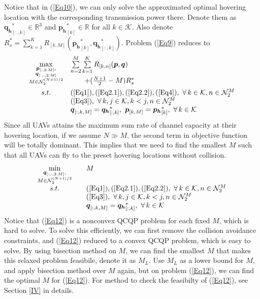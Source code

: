 \documentclass[10pt,final,conference]{IEEEtran}
\begin{document}
Notice that in (\ref{Eq10}), we can only solve the approximated optimal hovering location with the corresponding transmission power there. Denote them as $\boldsymbol{q_h}^*_{[:,k]}\in\mathbb{R}^3$ and $\boldsymbol{p_h}^*_{[k]}\in\mathbb{R}$ for all $k\in\mathcal{K}$. Also denote $R_s^*=\sum_{k=1}^KR_{[k,M]}(\boldsymbol{p_h}^*_{[k]},\boldsymbol{q_h}^*_{[:,k]})$. Problem (\ref{Eq9}) reduces to
\begin{equation}\label{Eq11}
	\begin{array}{cl}
		\max\limits_{\substack{\boldsymbol{p}_{[:,2:M]}, \\ \boldsymbol{q}_{[:,:,2:M]} \\ M\in\mathcal{N}_2^{(N+1)/2}
		}} & \sum\limits_{n=2}^{M}\sum\limits_{k=1}^K R_{[k,n]}(\boldsymbol{p},\boldsymbol{q}) \\[-13pt] &\qquad+(\frac{N+1}{2}-M)R_s^* \\[5pt]
		s.t.  & (\ref{Eq1}),(\ref{Eq2.1}),(\ref{Eq2.2}),(\ref{Eq4}),\ \forall\,k\in\mathcal{K},n\in\mathcal{N}_2^M \\
		& (\ref{Eq3}),\ \forall\,k,j\in\mathcal{K},k<j,n\in\mathcal{N}_2^M \\
		& \boldsymbol{q}_{[:,k,M]}=\boldsymbol{q_h}^*_{[:,k]},\   \boldsymbol{p}_{[k,M]} = \boldsymbol{p_h}^*_{[k]},\  \forall\,k\in\mathcal{K}
	\end{array}
\end{equation}
Since all UAVs attains the maximum sum rate of channel capacity at their hovering location, if we assume $N\gg M$, the second term in objective function will be totally dominant. This implies that we need to find the smallest $M$ such that all UAVs can fly to the preset hovering locations without collision.
\begin{equation}\label{Eq12}
	\begin{array}{cll}
		\min\limits_{\substack{\boldsymbol{q}_{[:,:,2:M]}, \\ M\in\mathcal{N}_2^{(N+1)/2}}}\quad & M \\ 
		s.t. \quad & (\ref{Eq1}),(\ref{Eq2.1}),(\ref{Eq2.2}),\ \forall\,k\in\mathcal{K},n\in\mathcal{N}_2^M \\
		& (\ref{Eq3}),\ \forall\,k,j\in\mathcal{K},k<j,n\in\mathcal{N}_2^M \\
		& \boldsymbol{q}_{[:,k,M]}=\boldsymbol{q_h}^*_{[:,k]},\  \forall\,k\in\mathcal{K}
	\end{array}
\end{equation}
Notice that (\ref{Eq12}) is a nonconvex QCQP problem for each fixed $M$, which is hard to solve. To solve this efficiently, we can first remove the collision avoidance constraints, and (\ref{Eq12}) reduced to a convex QCQP problem, which is easy to solve. By using bisection method on $M$, we can find the smallest $M$ that 
makes this relaxed problem feasibile, denote it as $M_L$. Use $M_L$ as a lower bound for $M$, and apply bisection method over $M$ again, but on problem (\ref{Eq12}), we can find the optimal $M$ for (\ref{Eq12}). For method to check the feasibilty of (\ref{Eq12}), see Section \ref{IV} in details.
\baselineskip
\end{document}
